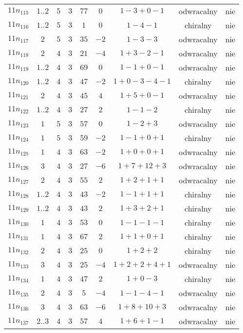 \begin{longtable}{ccccccccc}
$11n_{115}$ & $1..2$ & $5$ & $3$ & $77$ & $0$ & $1-3+0-1$ & odwracalny & nie \\
$11n_{116}$ & $1..2$ & $5$ & $3$ & $1$ & $0$ & $1-4-1$ & chiralny & nie \\
$11n_{117}$ & $2$ & $5$ & $3$ & $35$ & $-2$ & $1-3-3$ & odwracalny & nie \\
$11n_{118}$ & $2$ & $4$ & $3$ & $21$ & $-4$ & $1+3-2-1$ & odwracalny & nie \\
$11n_{119}$ & $1..2$ & $4$ & $3$ & $69$ & $0$ & $1-1+0-1$ & odwracalny & nie \\
$11n_{120}$ & $1..2$ & $4$ & $3$ & $47$ & $-2$ & $1+0-3-4-1$ & chiralny & nie \\
$11n_{121}$ & $2$ & $4$ & $3$ & $45$ & $4$ & $1+5+0-1$ & odwracalny & nie \\
$11n_{122}$ & $1..2$ & $4$ & $3$ & $27$ & $2$ & $1-1-2$ & chiralny & nie \\
$11n_{123}$ & $1$ & $5$ & $3$ & $57$ & $0$ & $1-2+3$ & odwracalny & nie \\
$11n_{124}$ & $1$ & $5$ & $3$ & $59$ & $-2$ & $1-1+0+1$ & chiralny & nie \\
$11n_{125}$ & $1$ & $4$ & $3$ & $63$ & $-2$ & $1+0+0+1$ & odwracalny & nie \\
$11n_{126}$ & $3$ & $4$ & $3$ & $27$ & $-6$ & $1+7+12+3$ & odwracalny & nie \\
$11n_{127}$ & $2$ & $4$ & $3$ & $55$ & $2$ & $1+2+1+1$ & odwracalny & nie \\
$11n_{128}$ & $1..2$ & $4$ & $3$ & $43$ & $-2$ & $1-1+1+1$ & chiralny & nie \\
$11n_{129}$ & $1..2$ & $4$ & $3$ & $43$ & $2$ & $1+3+2+1$ & chiralny & nie \\
$11n_{130}$ & $1$ & $4$ & $3$ & $53$ & $0$ & $1-1-1-1$ & chiralny & nie \\
$11n_{131}$ & $1$ & $4$ & $3$ & $67$ & $2$ & $1+1+0+1$ & chiralny & nie \\
$11n_{132}$ & $2$ & $4$ & $3$ & $25$ & $0$ & $1+2+2$ & chiralny & nie \\
$11n_{133}$ & $3$ & $4$ & $3$ & $25$ & $-4$ & $1+2+2+4+1$ & odwracalny & nie \\
$11n_{134}$ & $1$ & $4$ & $3$ & $47$ & $2$ & $1+0-3$ & chiralny & nie \\
$11n_{135}$ & $2$ & $4$ & $3$ & $5$ & $-4$ & $1-1-4-1$ & odwracalny & nie \\
$11n_{136}$ & $3$ & $4$ & $3$ & $63$ & $-6$ & $1+8+10+3$ & odwracalny & nie \\
$11n_{137}$ & $2..3$ & $4$ & $3$ & $57$ & $4$ & $1+6+1-1$ & odwracalny & nie \\

\end{longtable}
